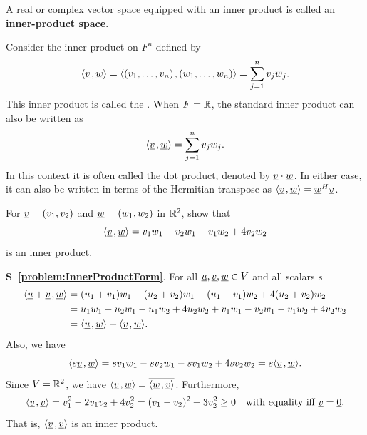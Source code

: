\begin{definition}
A real or complex vector space equipped with an inner product is called an \textbf{inner-product space}.
\end{definition}

\begin{example} \label{example:StandardInnerProduct}
Consider the inner product on $F^n$ defined by
\begin{equation*}
{\left\langle  \underline{v}  \mskip2mu ,  \underline{w}  \right\rangle}
= {\left\langle  (v_1, \ldots, v_n)  \mskip2mu ,  (w_1, \ldots, w_n)  \right\rangle}
= \sum_{j=1}^n v_j \overline{w}_j.
\end{equation*}
This inner product is called the .
When $F = \mathbb{R}$, the standard inner product can also be written as
\begin{equation*}
{\left\langle  \underline{v}  \mskip2mu ,  \underline{w}  \right\rangle}
= \sum_{j=1}^n v_j w_j.
\end{equation*}
In this context it is often called the dot product, denoted by $\underline{v} \cdot \underline{w}$.
In either case, it can also be written in terms of the Hermitian transpose as $ {\left\langle  \underline{v}  \mskip2mu ,  \underline{w}  \right\rangle} = \underline{w}^H \underline{v} $.
\end{example}

\begin{problem} \label{problem:InnerProductForm}
For $\underline{v} = (v_1, v_2)$ and $\underline{w} = (w_1, w_2)$  in $\mathbb{R}^2$, show that
\begin{equation*}
{\left\langle  \underline{v}  \mskip2mu ,  \underline{w}  \right\rangle}
= v_1 w_1 - v_2 w_1 - v_1 w_2 + 4 v_2 w_2
\end{equation*}
is an inner product.
\end{problem}
\noindent \textbf{S~\ref{problem:InnerProductForm}}.
For all $\underline{u}, \underline{v}, \underline{w} \in V$ and all scalars $s$
\begin{equation*}
\begin{split}
{\left\langle  \underline{u} + \underline{v}  \mskip2mu ,  \underline{w}  \right\rangle}
&= (u_1 + v_1) w_1 - (u_2 + v_2) w_1 - (u_1 + v_1) w_2 + 4 (u_2 + v_2) w_2 \\
&= u_1 w_1 - u_2 w_1 - u_1 w_2 + 4 u_2 w_2
+ v_1 w_1 - v_2 w_1 - v_1 w_2 + 4 v_2 w_2 \\
&= {\left\langle  \underline{u}  \mskip2mu ,  \underline{w}  \right\rangle}
+ {\left\langle  \underline{v}  \mskip2mu ,  \underline{w}  \right\rangle}.
\end{split}
\end{equation*}
Also, we have
\begin{equation*}
{\left\langle  s \underline{v}  \mskip2mu ,  \underline{w}  \right\rangle}
= s v_1 w_1 - s v_2 w_1 - s v_1 w_2 + 4 s v_2 w_2
= s {\left\langle  \underline{v}  \mskip2mu ,  \underline{w}  \right\rangle}.
\end{equation*}
Since $V = \mathbb{R}^2$, we have ${\left\langle  \underline{v}  \mskip2mu ,  \underline{w}  \right\rangle} = \overline{ {\left\langle  \underline{w}  \mskip2mu ,  \underline{v}  \right\rangle} }$.
Furthermore,
\begin{equation*}
{\left\langle  \underline{v}  \mskip2mu ,  \underline{v}  \right\rangle}
= v_1^2 - 2 v_1 v_2 + 4 v_2^2
= ( v_1 - v_2 )^2 + 3 v_2^2
\geq 0
\quad \text{with equality iff } \underline{v} = \underline{0}.
\end{equation*}
That is, ${\left\langle  \underline{v}  \mskip2mu ,  \underline{v}  \right\rangle}$ is an inner product.



